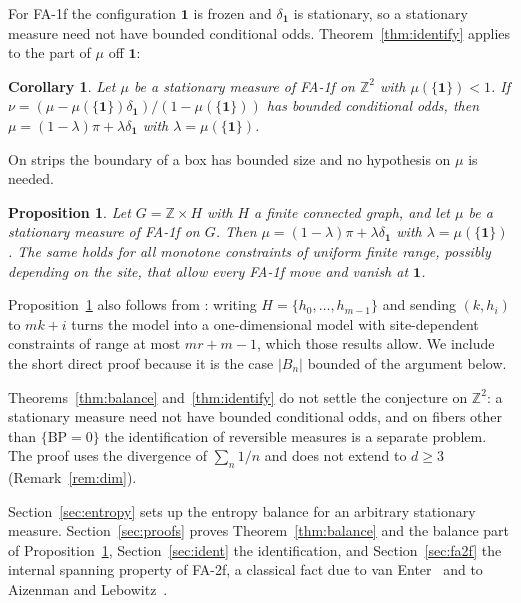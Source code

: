 \documentclass[11pt]{amsart}
\newtheorem{proposition}[theorem]{Proposition}
\newtheorem{corollary}[theorem]{Corollary}
\theoremstyle{remark}
\newcommand{\Z}{\mathbb{Z}}
\newcommand{\BP}{\mathrm{BP}}
\begin{document}
For FA-1f the configuration $\mathbf 1$ is frozen and $\delta_{\mathbf 1}$ is stationary, so a stationary measure
need not have bounded conditional odds. Theorem~\ref{thm:identify} applies to the part of $\mu$ off $\mathbf 1$:

\begin{corollary}\label{cor:fa1f}
Let $\mu$ be a stationary measure of FA-1f on $\Z^2$ with $\mu(\{\mathbf 1\})<1$. If
$\nu=(\mu-\mu(\{\mathbf 1\})\delta_{\mathbf 1})/(1-\mu(\{\mathbf 1\}))$ has bounded conditional odds, then
$\mu=(1-\lambda)\pi+\lambda\delta_{\mathbf 1}$ with $\lambda=\mu(\{\mathbf 1\})$.
\end{corollary}

On strips the boundary of a box has bounded size and no hypothesis on $\mu$ is needed.

\begin{proposition}\label{prop:strip}
Let $G=\Z\times H$ with $H$ a finite connected graph, and let $\mu$ be a stationary measure of FA-1f on $G$. Then
$\mu=(1-\lambda)\pi+\lambda\delta_{\mathbf 1}$ with $\lambda=\mu(\{\mathbf 1\})$. The same holds for all monotone
constraints of uniform finite range, possibly depending on the site, that allow every FA-1f move and vanish at
$\mathbf 1$.
\end{proposition}

Proposition~\ref{prop:strip} also follows from \cite[Theorem~2.5 and Lemma~2.8]{MST25}: writing
$H=\{h_0,\dots,h_{m-1}\}$ and sending $(k,h_i)$ to $mk+i$ turns the model into a one-dimensional model with
site-dependent constraints of range at most $mr+m-1$, which those results allow. We include the short direct proof
because it is the case $|B_n|$ bounded of the argument below.

Theorems~\ref{thm:balance} and~\ref{thm:identify} do not settle the conjecture on $\Z^2$: a stationary measure need
not have bounded conditional odds, and on fibers other than $\{\BP=0\}$ the identification of reversible measures is a
separate problem. The proof uses the divergence of $\sum_n1/n$ and does not extend to $d\ge3$
(Remark~\ref{rem:dim}).

Section~\ref{sec:entropy} sets up the entropy balance for an arbitrary stationary measure. Section~\ref{sec:proofs}
proves Theorem~\ref{thm:balance} and the balance part of Proposition~\ref{prop:strip}, Section~\ref{sec:ident} the
identification, and Section~\ref{sec:fa2f} the internal spanning property of FA-2f, a classical fact due to van
Enter~\cite{vE87} and to Aizenman and Lebowitz~\cite{AL88}.
\end{document}
